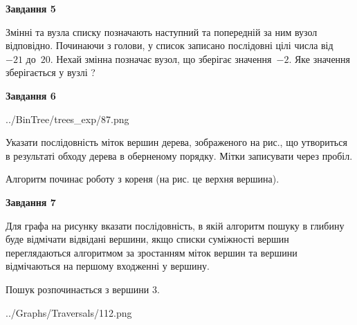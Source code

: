 \documentclass[12pt, ukrainian]{article}
\begin{document}
{\begin {large}
{\begin {center}\textbf{Завдання 5}\end {center}}\par
Змінні  та  вузла списку позначають наступний та попередній за ним вузол відповідно. Починаючи з голови, у список записано послідовні цілі числа від~$-21$ до~$20$. Нехай змінна  позначає вузол, що зберігає значення~$-2$.
Яке значення зберігається у вузлі  ?\par
\newpage

{\begin {center}\textbf{Завдання 6}\end {center}}\par

\begin{center}
	{../BinTree/trees_exp/87.png}
\end{center}
Указати послідовність міток вершин дерева, зображеного на рис., що утвориться в результаті обходу дерева в оберненому порядку. Мітки записувати через пробіл.\par Алгоритм починає роботу з кореня (на рис. це верхня вершина).\par
\newpage

{\begin {center}\textbf{Завдання 7}\end {center}}\par
Для графа на рисунку вказати послідовність, в якій алгоритм пошуку в глибину буде відмічати відвідані вершини, якщо списки суміжності вершин переглядаються алгоритмом за зростанням міток вершин та вершини відмічаються на першому вход\-женні у вершину.\par
Пошук розпочинається з вершини 3.\par

\begin{center}
	{../Graphs/Traversals/112.png}
\end{center}\par
\newpage


\end{large}}
\end{document}

